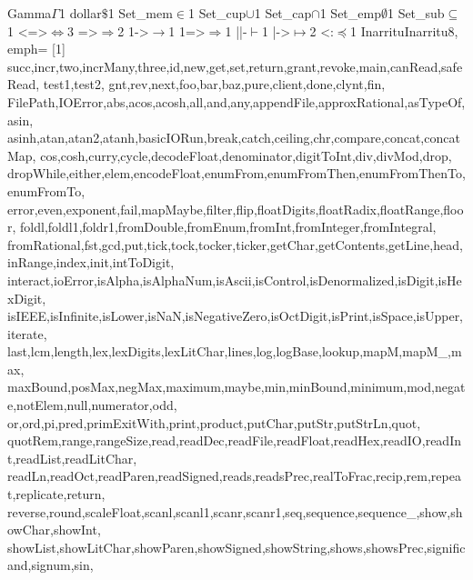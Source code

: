 {{           {Gamma}{{$\Gamma$}}1                        %
           {dollar}{{$\texttt{\$}$}}1
           {Set_mem}{{$\in$}}1
           {Set_cup}{{$\cup$}}1
           {Set_cap}{{$\cap$}}1
           {Set_emp}{{$\emptyset$}}1
           {Set_sub}{{$\subseteq$}}1
           {<=>}{{$\Leftrightarrow$}}3
           {=>}{{$\Rightarrow$}}2
           {1->}{{$\rightarrow$}}1
           {1=>}{{$\Rightarrow$}}1
           {||-}{{$\vdash$}}1
           {|->}{{$\mapsto$}}2
           {<:}{{$\preceq$}}1
           {Inarritu}{Inarritu}8},
  emph=
  {[1]
    succ,incr,two,incrMany,three,id,new,get,set,return,grant,revoke,main,canRead,safeRead,
    test1,test2,
    gnt,rev,next,foo,bar,baz,pure,client,done,clynt,fin,
    FilePath,IOError,abs,acos,acosh,all,and,any,appendFile,approxRational,asTypeOf,asin,
    asinh,atan,atan2,atanh,basicIORun,break,catch,ceiling,chr,compare,concat,concatMap,
    cos,cosh,curry,cycle,decodeFloat,denominator,digitToInt,div,divMod,drop,
    dropWhile,either,elem,encodeFloat,enumFrom,enumFromThen,enumFromThenTo,enumFromTo,
    error,even,exponent,fail,mapMaybe,filter,flip,floatDigits,floatRadix,floatRange,floor,
    foldl,foldl1,foldr1,fromDouble,fromEnum,fromInt,fromInteger,fromIntegral,
    fromRational,fst,gcd,put,tick,tock,tocker,ticker,getChar,getContents,getLine,head,inRange,index,init,intToDigit,
    interact,ioError,isAlpha,isAlphaNum,isAscii,isControl,isDenormalized,isDigit,isHexDigit,
    isIEEE,isInfinite,isLower,isNaN,isNegativeZero,isOctDigit,isPrint,isSpace,isUpper,iterate,
    last,lcm,length,lex,lexDigits,lexLitChar,lines,log,logBase,lookup,mapM,mapM_,max,
    maxBound,posMax,negMax,maximum,maybe,min,minBound,minimum,mod,negate,notElem,null,numerator,odd,
    or,ord,pi,pred,primExitWith,print,product,putChar,putStr,putStrLn,quot,
    quotRem,range,rangeSize,read,readDec,readFile,readFloat,readHex,readIO,readInt,readList,readLitChar,
    readLn,readOct,readParen,readSigned,reads,readsPrec,realToFrac,recip,rem,repeat,replicate,return,
    reverse,round,scaleFloat,scanl,scanl1,scanr,scanr1,seq,sequence,sequence_,show,showChar,showInt,
    showList,showLitChar,showParen,showSigned,showString,shows,showsPrec,significand,signum,sin,
}}
